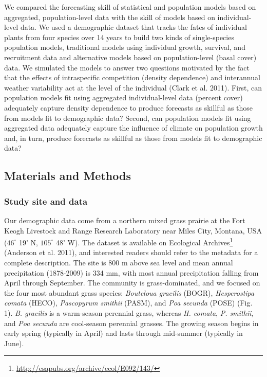 \documentclass[12pt,]{article}
\let\rmarkdownfootnote\footnote%
\def\footnote{\protect\rmarkdownfootnote}
\begin{document}
We compared the forecasting skill of statistical and population models
based on aggregated, population-level data with the skill of models
based on individual-level data. We used a demographic dataset that
tracks the fates of individual plants from four species over 14 years to
build two kinds of single-species population models, traditional models
using individual growth, survival, and recruitment data and alternative
models based on population-level (basal cover) data. We simulated the
models to answer two questions motivated by the fact that the effects of
intraspecific competition (density dependence) and interannual weather
variability act at the level of the individual (Clark et al. 2011).
First, can population models fit using aggregated individual-level data
(percent cover) adequately capture density dependence to produce
forecasts as skillful as those from models fit to demographic data?
Second, can population models fit using aggregated data adequately
capture the influence of climate on population growth and, in turn,
produce forecasts as skillful as those from models fit to demographic
data?

\subsection{Materials and Methods}\label{materials-and-methods}

\subsubsection{Study site and data}\label{study-site-and-data}

Our demographic data come from a northern mixed grass prairie at the
Fort Keogh Livestock and Range Research Laboratory near Miles City,
Montana, USA (\(46^{\circ}\) 19' N, \(105^{\circ}\) 48' W). The dataset
is available on Ecological Archives\footnote{\url{http://esapubs.org/archive/ecol/E092/143/}}
(Anderson et al. 2011), and interested readers should refer to the
metadata for a complete description. The site is 800 m above sea level
and mean annual precipitation (1878-2009) is 334 mm, with most annual
precipitation falling from April through September. The community is
grass-dominated, and we focused on the four most abundant grass species:
\emph{Bouteloua gracilis} (BOGR), \emph{Hesperostipa comata} (HECO),
\emph{Pascopyrum smithii} (PASM), and \emph{Poa secunda} (POSE) (Fig.
1). \emph{B. gracilis} is a warm-season perennial grass, whereas
\emph{H. comata}, \emph{P. smithii}, and \emph{Poa secunda} are
cool-season perennial grasses. The growing season begins in early spring
(typically in April) and lasts through mid-summer (typically in June).
\end{document}
